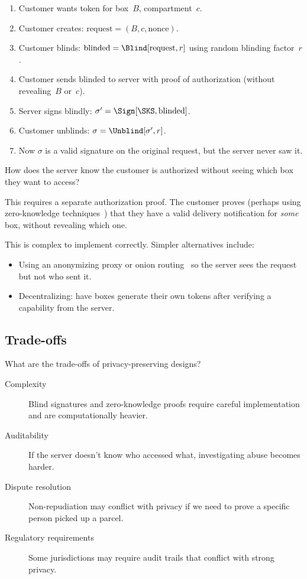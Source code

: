 \begin{enumerate}
  \item Customer wants token for box~\(B\), compartment~\(c\).
  \item Customer creates: \(\text{request} = (B, c, \text{nonce})\).
  \item Customer blinds: \(\text{blinded} = \Blind[\text{request}, r]\)
    using random blinding factor~\(r\).
  \item Customer sends \(\text{blinded}\) to server with proof of
    authorization (without revealing~\(B\) or~\(c\)).
  \item Server signs blindly: \(\sigma' = \Sign[\SKS, \text{blinded}]\).
  \item Customer unblinds: \(\sigma = \Unblind[\sigma', r]\).
  \item Now \(\sigma\) is a valid signature on the original request, but
    the server never saw it.
\end{enumerate}

\begin{exercise}
  How does the server know the customer is authorized without seeing
  which box they want to access?
\end{exercise}

This requires a separate authorization proof.
The customer proves (perhaps using zero-knowledge
techniques~\autocite{GMR1989zk}) that they have a valid delivery
notification for \emph{some} box, without revealing which one.

This is complex to implement correctly.
Simpler alternatives include:
\begin{itemize}
  \item Using an anonymizing proxy or onion
    routing~\autocite{OnionRouting1996,Tor} so the
    server sees the request but not who sent it.
  \item Decentralizing: have boxes generate their own tokens after
    verifying a capability from the server.
\end{itemize}

\subsection{Trade-offs}

\begin{exercise}
  What are the trade-offs of privacy-preserving designs?
\end{exercise}

\begin{description}
  \item[Complexity] Blind signatures and zero-knowledge proofs require
    careful implementation and are computationally heavier.
  \item[Auditability] If the server doesn't know who accessed what,
    investigating abuse becomes harder.
  \item[Dispute resolution] Non-repudiation may conflict with privacy if
    we need to prove a specific person picked up a parcel.
  \item[Regulatory requirements] Some jurisdictions may require audit
    trails that conflict with strong privacy.
\end{description}

